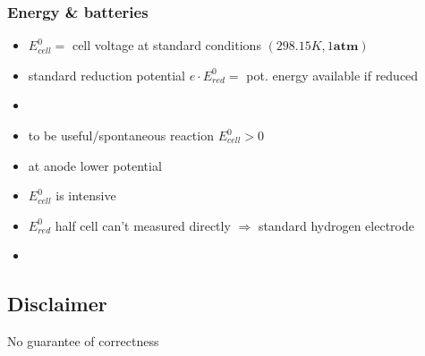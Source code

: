 \documentclass[ wastespaceontitle, english]{cheat_sheet_template}
\begin{document}
    \subsubsection{Energy \& batteries}
    \begin{itemize}
        \item $E_{cell}^0 =$ cell voltage at standard conditions $(298.15K,1 \textbf{atm})$
        \item standard reduction potential $e \cdot E^0_{red} =$ pot. energy available if reduced
        \item {}
        \item to be useful/spontaneous reaction $E_{cell}^0 >0$
        \item at anode lower potential
        \item $E_{cell}^0$ is intensive
        \item $E_{red}^0$ half cell can't measured directly $\Rightarrow$ standard hydrogen electrode
        \item {}
    \end{itemize}

\subsection{Disclaimer}
No guarantee of correctness
\end{document}
